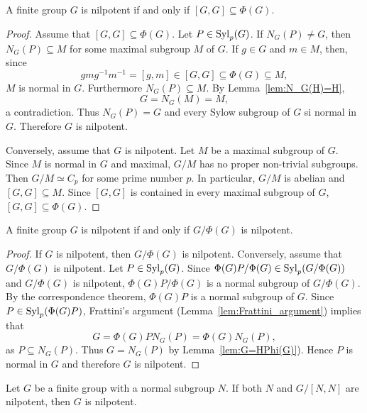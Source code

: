 \begin{theorem}[Wielandt]
\label{thm:Wielandt}
A finite group $G$ is nilpotent if and only if 
$[G,G]\subseteq\Phi(G)$.
\end{theorem}

\begin{proof}
Assume that $[G,G]\subseteq\Phi(G)$. Let $P\in\mathrm{Syl}_p(G)$. If $N_G(P)\ne
G$, then $N_G(P)\subseteq M$ for some maximal subgroup $M$ of $G$. If 
$g\in G$ and $m\in M$, then, since 
\[
	gmg^{-1}m^{-1}=[g,m]\in [G,G]\subseteq\Phi(G)\subseteq M,
\]
$M$ is normal in $G$. Furthermore $N_G(P)\subseteq M$. 
By Lemma~\ref{lem:N_G(H)=H},
\[
G=N_G(M)=M,
\]
a contradiction.
Thus $N_G(P)=G$ and every Sylow subgroup of $G$ si normal in $G$. Therefore 
$G$ is nilpotent. 

Conversely, assume that $G$ is nilpotent. Let $M$ be a maximal subgroup of $G$.
Since $M$ is normal in $G$ and maximal, $G/M$ has no proper non-trivial subgroups. 
Then $G/M\simeq C_p$ for some prime number $p$. In particular, $G/M$ is abelian
and $[G,G]\subseteq M$. Since $[G,G]$ is contained in every maximal subgroup of $G$, 
$[G,G]\subseteq\Phi(G)$.
\end{proof}

\begin{theorem}
\label{the:G/phi(G)}
A finite group $G$ is nilpotent if and only if 
$G/\Phi(G)$ is nilpotent. 
\end{theorem}

\begin{proof}
If $G$ is nilpotent, then $G/\Phi(G)$ is nilpotent. Conversely, assume that 
$G/\Phi(G)$ is nilpotent. Let $P\in\mathrm{Syl}_p(G)$. Since 
$\Phi(G)P/\Phi(G)\in\mathrm{Syl}_p(G/\Phi(G))$ and $G/\Phi(G)$ is nilpotent,
$\Phi(G)P/\Phi(G)$ is a normal subgroup of $G/\Phi(G)$. By the correspondence theorem, 
$\Phi(G)P$ is a normal subgroup of $G$.
Since $P\in\mathrm{Syl}_p(\Phi(G)P)$, Frattini's argument 
(Lemma~\ref{lem:Frattini_argument}) implies that 
\[
G=\Phi(G)PN_G(P)=\Phi(G)N_G(P), 
\]
as $P\subseteq N_G(P)$. Thus $G=N_G(P)$ by Lemma~\ref{lem:G=HPhi(G)}). Hence 
$P$ is normal in $G$ and therefore $G$ is nilpotent. 
\end{proof}

\begin{theorem}[Hall]
\label{thm:Hall_nilpotente}
Let $G$ be a finite group with a normal subgroup $N$. If both $N$ and 
$G/[N,N]$ are nilpotent, then $G$ is nilpotent.
\end{theorem}

